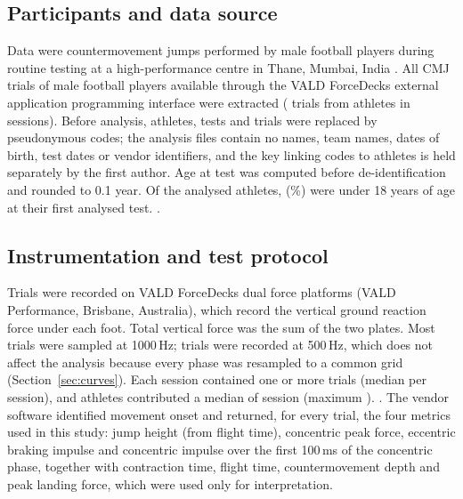 

\subsection{Participants and data source}

Data were countermovement jumps performed by male football players during routine testing at a high-performance centre in Thane, Mumbai, India . All CMJ trials of male football players available through the VALD ForceDecks external application programming interface were extracted (\nTrialsAll{} trials from \nAthAll{} athletes in \nSessAll{} sessions). Before analysis, athletes, tests and trials were replaced by pseudonymous codes; the analysis files contain no names, team names, dates of birth, test dates or vendor identifiers, and the key linking codes to athletes is held separately by the first author. Age at test was computed before de-identification and rounded to 0.1 year. Of the \nAth{} analysed athletes, \nMinors{} (\pctMinors\%) were under 18 years of age at their first analysed test. .

\subsection{Instrumentation and test protocol}

Trials were recorded on VALD ForceDecks dual force platforms (VALD Performance, Brisbane, Australia), which record the vertical ground reaction force under each foot. Total vertical force was the sum of the two plates. Most trials were sampled at 1000\,Hz; \nFsLow{} trials were recorded at 500\,Hz, which does not affect the analysis because every phase was resampled to a common grid (Section~\ref{sec:curves}). Each session contained one or more trials (median \trialsPerSessMedian{} per session), and athletes contributed a median of \sessPerAthMedian{} session (maximum \sessPerAthMax). . The vendor software identified movement onset and returned, for every trial, the four metrics used in this study: jump height (from flight time), concentric peak force, eccentric braking impulse and concentric impulse over the first 100\,ms of the concentric phase, together with contraction time, flight time, countermovement depth and peak landing force, which were used only for interpretation.

